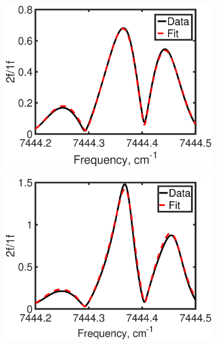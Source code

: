 \begin{figure}
\begin{subfigure}[b]{0.475\linewidth}  
\includegraphics[width=\textwidth]{fig/LOS_1343_fit.eps}  
\end{subfigure}%
\hfill
\begin{subfigure}[b]{0.475\linewidth}  
\centering  
\includegraphics[width=\textwidth]{fig/SE_1343_fit.eps}  
\end{subfigure} 


\end{figure}
